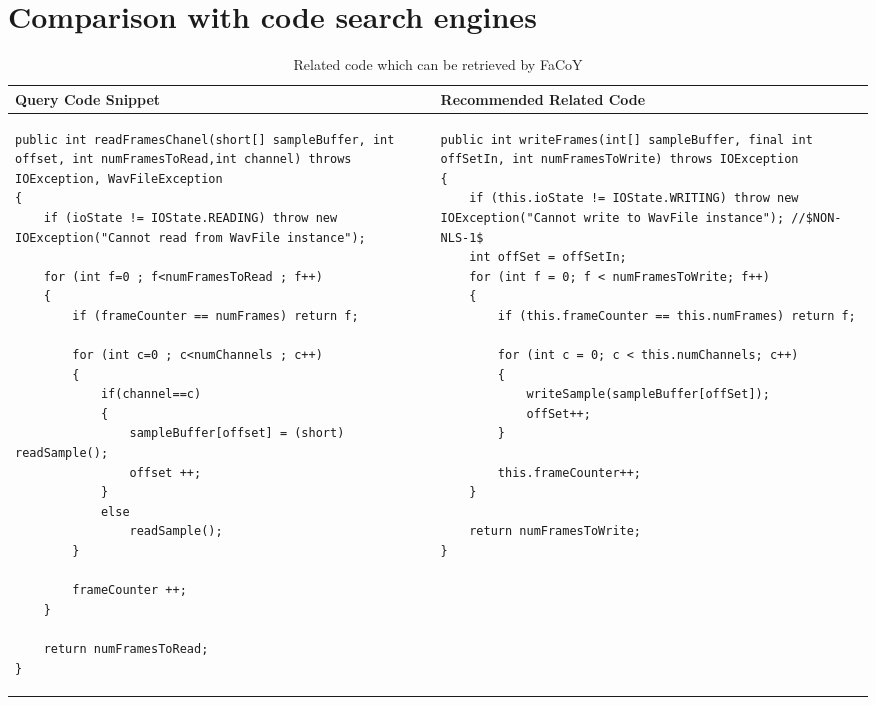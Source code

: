 \section{Comparison with code search engines}


\lstset{
	frame=none,
	aboveskip=0pt,
	belowskip=0pt,
	basicstyle=\tiny\ttfamily,
}
\begin{table*}\scriptsize
	\caption{Related code which can be retrieved by FaCoY}
	\label{tab:facoy-example}
	
	\setlength{\tabcolsep}{0.01\textwidth}
	\begin{tabular}{@{}p{}p{}@{}}
		\toprule
		Query Code Snippet & Recommended Related Code \\
		\midrule


\begin{lstlisting}
public int readFramesChanel(short[] sampleBuffer, int offset, int numFramesToRead,int channel) throws IOException, WavFileException
{
	if (ioState != IOState.READING) throw new IOException("Cannot read from WavFile instance");

	for (int f=0 ; f<numFramesToRead ; f++)
	{
		if (frameCounter == numFrames) return f;

		for (int c=0 ; c<numChannels ; c++)
		{
			if(channel==c)
			{
				sampleBuffer[offset] = (short) readSample();
				offset ++;
			}
			else
				readSample();
		}

		frameCounter ++;
	}

	return numFramesToRead;
}
\end{lstlisting}
		
		&
\begin{lstlisting}
public int writeFrames(int[] sampleBuffer, final int offSetIn, int numFramesToWrite) throws IOException
{
	if (this.ioState != IOState.WRITING) throw new IOException("Cannot write to WavFile instance"); //$NON-NLS-1$
	int offSet = offSetIn;
	for (int f = 0; f < numFramesToWrite; f++)
	{
		if (this.frameCounter == this.numFrames) return f;

		for (int c = 0; c < this.numChannels; c++)
		{
			writeSample(sampleBuffer[offSet]);
			offSet++;
		}

		this.frameCounter++;
	}

	return numFramesToWrite;
}
		
\end{lstlisting}
\\

\bottomrule
	\end{tabular}
\end{table*}
		

